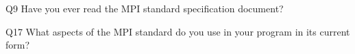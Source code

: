 \begin{description}%
\item{Q9} Have you ever read the MPI standard specification document?%
\item{Q17} What aspects of the MPI standard do you use in your program in its current form?%
\end{description}%
